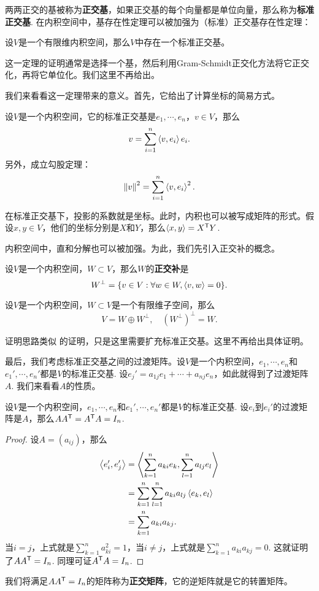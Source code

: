 两两正交的基被称为\textbf{正交基}，如果正交基的每个向量都是单位向量，那么称为\textbf{标准正交基}. 在内积空间中，基存在性定理可以被加强为（标准）正交基存在性定理：

\begin{theorem}[标准正交基存在性定理]\label{thm:orthogonal-basis}
设$V$是一个有限维内积空间，那么$V$中存在一个标准正交基。
\end{theorem}
这一定理的证明通常是选择一个基，然后利用Gram-Schmidt正交化方法将它正交化，再将它单位化。我们这里不再给出。

我们来看看这一定理带来的意义。首先，它给出了计算坐标的简易方式。

\begin{proposition}\label{prop:projection}
设$V$是一个内积空间，它的标准正交基是$e_1,\cdots,e_n$，$v\in V$，那么
\[
    v=\sum_{i=1}^n\left\langle{v},{e_i}\right\rangle e_i.
\]
另外，成立勾股定理：
\[
    \left\|v\right\|^2=\sum_{i=1}^n\left\langle{v},{e_i}\right\rangle^2.
\]
\end{proposition}
在标准正交基下，投影的系数就是坐标。此时，内积也可以被写成矩阵的形式。假设$x,y\in V$，他们的坐标分别是$X$和$Y$，那么$\left\langle{x},{y}\right\rangle=X^{\mathsf{T}} Y$.

内积空间中，直和分解也可以被加强。为此，我们先引入正交补的概念。

\begin{definition}[正交补]\label{def:orthogonal-complement}
设$V$是一个内积空间，$W\subset V$，那么$W$的\textbf{正交补}是
\[
    W^\bot=\{v\in V:\forall w\in W,\left\langle{v},{w}\right\rangle=0\}.
\]
\end{definition}

\begin{theorem}\label{prop:orthogonal-complement}
设$V$是一个内积空间，$W\subset V$是一个有限维子空间，那么
\[
    V=W\oplus W^\bot,\quad (W^\bot)^\bot=W.
\]
\end{theorem}
证明思路类似 的证明，只是这里需要扩充标准正交基。这里不再给出具体证明。

最后，我们考虑标准正交基之间的过渡矩阵。设$V$是一个内积空间，$e_1,\cdots,e_n$和$e_1',\cdots,e_n'$都是$V$的标准正交基. 设$e_j'=a_{1j}e_1+\cdots+a_{nj}e_n$，如此就得到了过渡矩阵$A$. 我们来看看$A$的性质。

\begin{proposition}
设$V$是一个内积空间，$e_1,\cdots,e_n$和$e_1',\cdots,e_n'$都是$V$的标准正交基. 设$e_i$到$e_i'$的过渡矩阵是$A$，那么$AA^{\mathsf{T}}=A^{\mathsf{T}} A=I_n$.
\end{proposition}
\begin{proof}
设$A=(a_{ij})$，那么
\begin{align*}
    \left\langle{e_i'},{e_j'}\right\rangle&=\left\langle{\sum_{k=1}^na_{ki}e_k},{\sum_{l=1}^na_{lj}e_l}\right\rangle \\
    &=\sum_{k=1}^n\sum_{l=1}^na_{ki}a_{lj}\left\langle{e_k},{e_l}\right\rangle \\
    &=\sum_{k=1}^na_{ki}a_{kj}.
\end{align*}
当$i=j$，上式就是$\sum_{k=1}^na_{ki}^2=1$，当$i\neq j$，上式就是$\sum_{k=1}^na_{ki}a_{kj}=0$. 这就证明了$AA^{\mathsf{T}}=I_n$. 同理可证$A^{\mathsf{T}} A=I_n$.
\end{proof}
我们将满足$AA^{\mathsf{T}}=I_n$的矩阵称为\textbf{正交矩阵}，它的逆矩阵就是它的转置矩阵。

